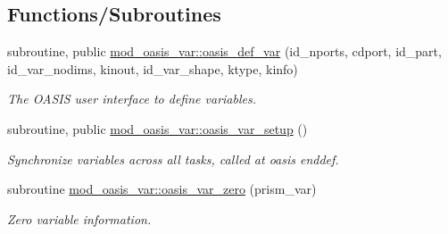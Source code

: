 \subsection*{Functions/\+Subroutines}
\begin{DoxyCompactItemize}
\item 
subroutine, public \hyperlink{namespacemod__oasis__var_a7d16403015304fadc15624773f87d2a0}{mod\+\_\+oasis\+\_\+var\+::oasis\+\_\+def\+\_\+var} (id\+\_\+nports, cdport, id\+\_\+part, id\+\_\+var\+\_\+nodims, kinout, id\+\_\+var\+\_\+shape, ktype, kinfo)
\begin{DoxyCompactList}\small\item\em The O\+A\+S\+IS user interface to define variables. \end{DoxyCompactList}\item 
subroutine, public \hyperlink{namespacemod__oasis__var_ab33b7fbec62bcfd15e9cd7f912f71035}{mod\+\_\+oasis\+\_\+var\+::oasis\+\_\+var\+\_\+setup} ()
\begin{DoxyCompactList}\small\item\em Synchronize variables across all tasks, called at oasis enddef. \end{DoxyCompactList}\item 
subroutine \hyperlink{namespacemod__oasis__var_aa780f62e9eded0a55d0077a990bf2443}{mod\+\_\+oasis\+\_\+var\+::oasis\+\_\+var\+\_\+zero} (prism\+\_\+var)
\begin{DoxyCompactList}\small\item\em Zero variable information. \end{DoxyCompactList}\end{DoxyCompactItemize}
